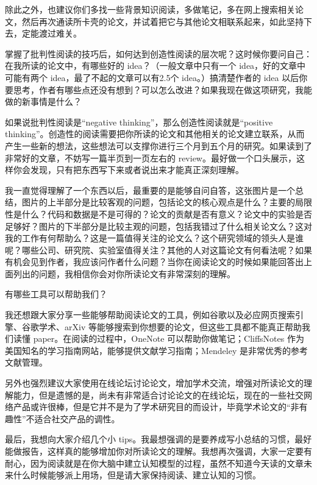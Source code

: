 除此之外，也建议你们多找一些背景知识阅读，多做笔记，多在网上搜索相关论文，然后再次通读所卡壳的论文，并试着把它与其他论文相联系起来，如此坚持下去，定能渡过难关。



掌握了批判性阅读的技巧后，如何达到创造性阅读的层次呢？这时候你要问自己：在我所读的论文中，有哪些好的 idea？（一般文章中只有一个 idea，好的文章中可能有两个 idea，最了不起的文章可以有2.5个 idea。）搞清楚作者的 idea 以后你要思考，作者有哪些点还没有想到？可以怎么改进？如果我现在做这项研究，我能做的新事情是什么？



如果说批判性阅读是“negative thinking”，那么创造性阅读就是“positive thinking”。创造性的阅读需要把你所读的论文和其他相关的论文建立联系，从而产生一些新的想法，这些想法可以支撑你进行三个月到五个月的研究。如果读到了非常好的文章，不妨写一篇半页到一页左右的 review。最好做一个口头展示，这样你会发现，只有把东西写下来或者说出来才能真正深刻理解。

我一直觉得理解了一个东西以后，最重要的是能够自问自答，这张图片是一个总结，图片的上半部分是比较客观的问题，包括论文的核心观点是什么？主要的局限性是什么？代码和数据是不是可得的？论文的贡献是否有意义？论文中的实验是否足够好？图片的下半部分是比较主观的问题，包括我错过了什么相关论文么？这对我的工作有何帮助么？这是一篇值得关注的论文么？这个研究领域的领头人是谁呢？哪些公司、研究院、实验室值得关注？其他的人对这篇论文有何看法呢？如果有机会见到作者，我应该问作者什么问题？当你在阅读论文的时候如果能回答出上面列出的问题，我相信你会对你所读论文有非常深刻的理解。




有哪些工具可以帮助我们？

我还想跟大家分享一些能够帮助阅读论文的工具，例如谷歌以及必应网页搜索引擎、谷歌学术、arXiv 等能够搜索到你想要的论文，但这些工具都不能真正帮助我们读懂 paper。在阅读的过程中，OneNote 可以帮助你做笔记；CliffsNotes 作为美国知名的学习指南网站，能够提供文献学习指南；Mendeley 是非常优秀的参考文献管理。



另外也强烈建议大家使用在线论坛讨论论文，增加学术交流，增强对所读论文的理解能力，但是遗憾的是，尚未有非常适合讨论论文的在线论坛，现在的一些社交网络产品或许很棒，但是它并不是为了学术研究目的而设计，毕竟学术论文的“非有趣性”不适合社交产品的调性。



最后，我想向大家介绍几个小 tips。我最想强调的是要养成写小总结的习惯，最好能做报告，这样真的能够增加你对所读论文的理解。我想再次强调，大家一定要有耐心，因为阅读就是在你大脑中建立认知模型的过程，虽然不知道今天读的文章未来什么时候能够派上用场，但是请大家保持阅读、建立认知的习惯。




